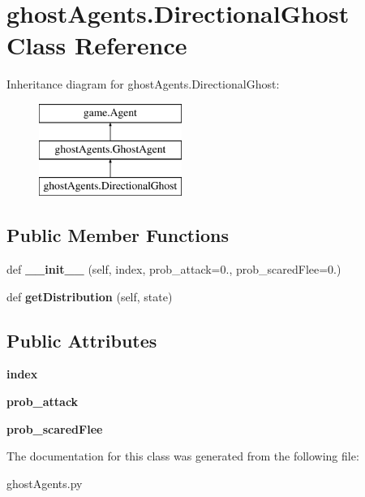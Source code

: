 \hypertarget{classghost_agents_1_1_directional_ghost}{}\section{ghost\+Agents.\+Directional\+Ghost Class Reference}
\label{classghost_agents_1_1_directional_ghost}
Inheritance diagram for ghost\+Agents.\+Directional\+Ghost\+:\begin{figure}[H]
\begin{center}
\leavevmode
\includegraphics[height=3.000000cm]{classghost_agents_1_1_directional_ghost}
\end{center}
\end{figure}
\subsection*{Public Member Functions}
\begin{DoxyCompactItemize}
\item 
\mbox{\label{classghost_agents_1_1_directional_ghost_a84a7ad40273af539193b243bdc779229}} 
def {\bfseries \+\_\+\+\_\+init\+\_\+\+\_\+} (self, index, prob\+\_\+attack=0., prob\+\_\+scared\+Flee=0.)
\item 
\mbox{\label{classghost_agents_1_1_directional_ghost_a1cb409334e25ac21e3a59e27d781492c}} 
def {\bfseries get\+Distribution} (self, state)
\end{DoxyCompactItemize}
\subsection*{Public Attributes}
\begin{DoxyCompactItemize}
\item 
\mbox{\label{classghost_agents_1_1_directional_ghost_a66b896f308bd62a74b5e9b4894334025}} 
{\bfseries index}
\item 
\mbox{\label{classghost_agents_1_1_directional_ghost_a6af983e40d698f5ef02eb6ced4f099cf}} 
{\bfseries prob\+\_\+attack}
\item 
\mbox{\label{classghost_agents_1_1_directional_ghost_a69be6e3e8116781a1b24889f5d938c13}} 
{\bfseries prob\+\_\+scared\+Flee}
\end{DoxyCompactItemize}


The documentation for this class was generated from the following file\+:\begin{DoxyCompactItemize}
\item 
ghost\+Agents.\+py\end{DoxyCompactItemize}
